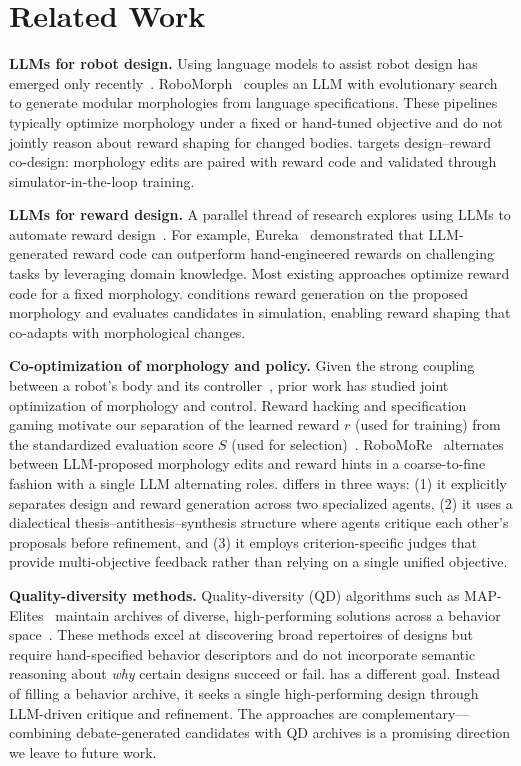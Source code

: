 \section{Related Work}
\label{sec:related_work}
\textbf{LLMs for robot design.} Using language models to assist robot design has emerged only recently~\cite{qiu2026robomorph, ringel2025text2robot}. RoboMorph~\cite{qiu2026robomorph} couples an LLM with evolutionary search to generate modular morphologies from language specifications. These pipelines typically optimize morphology under a fixed or hand-tuned objective and do not jointly reason about reward shaping for changed bodies. \abbrev{} targets design--reward co-design: morphology edits are paired with reward code and validated through simulator-in-the-loop training.

\textbf{LLMs for reward design.} A parallel thread of research explores using LLMs to automate reward design~\cite{ma2024eureka, kwon2023reward, yu2023language, xie2024text2reward}. For example, Eureka~\cite{ma2024eureka} demonstrated that LLM-generated reward code can outperform hand-engineered rewards on challenging tasks by leveraging domain knowledge. Most existing approaches optimize reward code for a fixed morphology. \abbrev{} conditions reward generation on the proposed morphology and evaluates candidates in simulation, enabling reward shaping that co-adapts with morphological changes.

\textbf{Co-optimization of morphology and policy.} Given the strong coupling between a robot's body and its controller~\cite{pfeifer2006morphological, sims1994evolving, cheney2018scalable}, prior work has studied joint optimization of morphology and control. Reward hacking and specification gaming motivate our separation of the learned reward $r$ (used for training) from the standardized evaluation score $S$ (used for selection)~\cite{amodei2016concrete, krakovna2020specification}. RoboMoRe~\cite{fang2025robomore} alternates between LLM-proposed morphology edits and reward hints in a coarse-to-fine fashion with a single LLM alternating roles. \abbrev{} differs in three ways: (1) it explicitly separates design and reward generation across two specialized agents, (2) it uses a dialectical thesis--antithesis--synthesis structure where agents critique each other's proposals before refinement, and (3) it employs criterion-specific judges that provide multi-objective feedback rather than relying on a single unified objective.

\textbf{Quality-diversity methods.} Quality-diversity (QD) algorithms such as MAP-Elites~\cite{mouret2015illuminating} maintain archives of diverse, high-performing solutions across a behavior space~\cite{pugh2016quality}. These methods excel at discovering broad repertoires of designs but require hand-specified behavior descriptors and do not incorporate semantic reasoning about \emph{why} certain designs succeed or fail. \abbrev{} has a different goal. Instead of filling a behavior archive, it seeks a single high-performing design through LLM-driven critique and refinement. The approaches are complementary---combining debate-generated candidates with QD archives is a promising direction we leave to future work.

